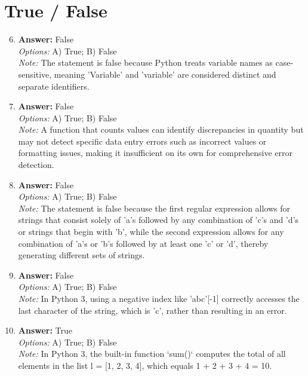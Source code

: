 \documentclass[12pt]{article}
\begin{document}
\section*{True / False}
\begin{enumerate}[label=\arabic*.]
\setcounter{enumi}{5}
\item \textbf{Answer:} False
\\ \textit{Options:} A) True; B) False
\\ \textit{Note:} The statement is false because Python treats variable names as case-sensitive, meaning 'Variable' and 'variable' are considered distinct and separate identifiers.
\item \textbf{Answer:} False
\\ \textit{Options:} A) True; B) False
\\ \textit{Note:} A function that counts values can identify discrepancies in quantity but may not detect specific data entry errors such as incorrect values or formatting issues, making it insufficient on its own for comprehensive error detection.
\item \textbf{Answer:} False
\\ \textit{Options:} A) True; B) False
\\ \textit{Note:} The statement is false because the first regular expression allows for strings that consist solely of 'a's followed by any combination of 'c's and 'd's or strings that begin with 'b', while the second expression allows for any combination of 'a's or 'b's followed by at least one 'c' or 'd', thereby generating different sets of strings.
\item \textbf{Answer:} False
\\ \textit{Options:} A) True; B) False
\\ \textit{Note:} In Python 3, using a negative index like 'abc'[-1] correctly accesses the last character of the string, which is 'c', rather than resulting in an error.
\item \textbf{Answer:} True
\\ \textit{Options:} A) True; B) False
\\ \textit{Note:} In Python 3, the built-in function `sum()` computes the total of all elements in the list l = [1, 2, 3, 4], which equals 1 + 2 + 3 + 4 = 10.
\end{enumerate}
\end{document}
